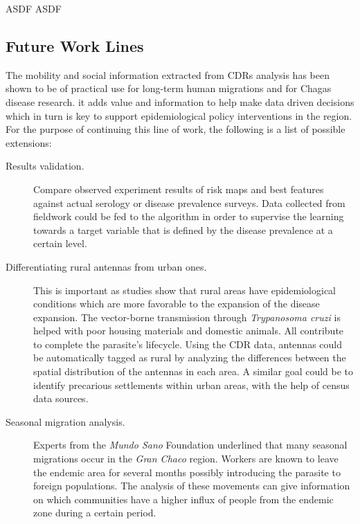 ASDF ASDF


\subsection{ Future Work Lines}

The mobility and social information extracted from CDRs analysis has been shown to be of practical use for long-term human migrations and for Chagas disease research.
it adds value and information to help make data driven decisions which in turn is key to support epidemiological policy interventions in the region.
For the purpose of continuing this line of work, the following is a list of possible extensions:

\begin{description}
    \item [Results validation.] Compare observed experiment results of risk maps and best features against actual serology or disease prevalence surveys.
    Data collected from fieldwork could be fed to the algorithm in order to supervise the learning towards a target variable that is defined by the disease prevalence at a certain level.

    \item [Differentiating rural antennas from urban ones.] This is important as studies show that rural areas have epidemiological conditions which are more favorable to the expansion of the disease expansion.
    The vector-borne transmission through \textit{Trypanosoma cruzi} is helped with poor housing materials and domestic animals.
    All  contribute to complete the parasite's lifecycle.
    Using the CDR data, antennas could be automatically tagged as rural by analyzing the differences between the spatial distribution of the antennas in each area.
    A similar goal could be to identify precarious settlements within urban areas, with the help of census data sources.

    \item [Seasonal migration analysis.] Experts from the \textit{Mundo Sano} Foundation underlined that many seasonal migrations occur in the \textit{Gran Chaco} region.
    Workers are known to leave the endemic area for several months possibly introducing the parasite to foreign populations.
    The analysis of these movements can give information on which communities have a higher influx of people from the endemic zone during a certain period.


\end{description}
